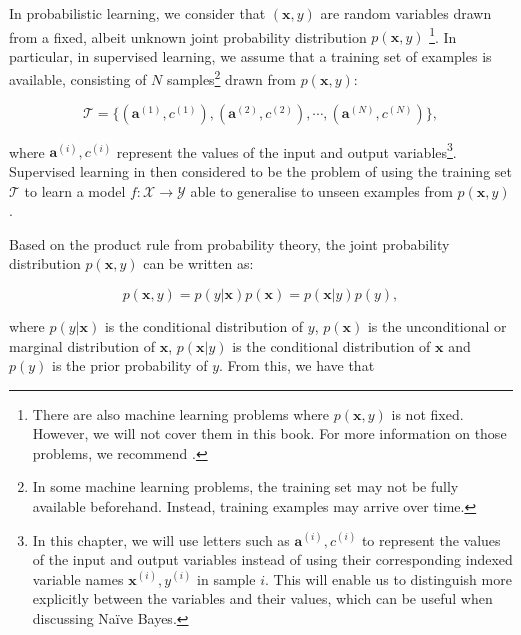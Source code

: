 In probabilistic learning, we consider that $(\mathbf{x},y)$ are random variables drawn from a fixed, albeit unknown joint probability distribution $p(\mathbf{x},y)$ \footnote{There are also machine learning problems where  $p(\mathbf{x},y)$ is not fixed. However, we will not cover them in this book. For more information on those problems, we recommend \cite{MLForDataStreams}.}. In particular, in supervised learning, we assume that a training set of examples is available, consisting of $N$ samples\footnote{In some machine learning problems, the training set may not be fully available beforehand. Instead, training examples may arrive over time.} drawn from $p(\mathbf{x},y)$:

\begin{equation} \mathcal{T} = \{(\mathbf{a}^{(1)},c^{(1)}),(\mathbf{a}^{(2)},c^{(2)}),\cdots, (\mathbf{a}^{(N)},c^{(N)})\}, \label{eq:training-set} \end{equation}

\noindent where $\mathbf{a}^{(i)},c^{(i)}$ represent the values of the input and output variables\footnote{In this chapter, we will use letters such as $\mathbf{a}^{(i)},c^{(i)}$ to represent the values of the input and output variables instead of using their corresponding indexed variable names $\mathbf{x}^{(i)},y^{(i)}$ in sample $i$. This will enable us to distinguish more explicitly between the variables and their values, which can be useful when discussing Na\"ive Bayes.}. 
Supervised learning in then considered to be the problem of using the training set $\mathcal{T}$ to learn a model $f: \mathcal{X} \rightarrow \mathcal{Y}$ able to generalise to unseen examples from $p(\mathbf{x},y)$. %

Based on the product rule from probability theory, the joint probability distribution $p(\mathbf{x},y)$ can be written as:

\[ p(\mathbf{x},y) = p(y|\mathbf{x}) p(\mathbf{x}) = p(\mathbf{x}|y) p(y),\]

\noindent where $p(y|\mathbf{x})$ is the conditional distribution of $y$, $p(\mathbf{x})$ is the unconditional or marginal distribution of $\mathbf{x}$, $p(\mathbf{x}|y)$ is the conditional distribution of $\mathbf{x}$ and $p(y)$ is the prior probability of $y$. From this, we have that

